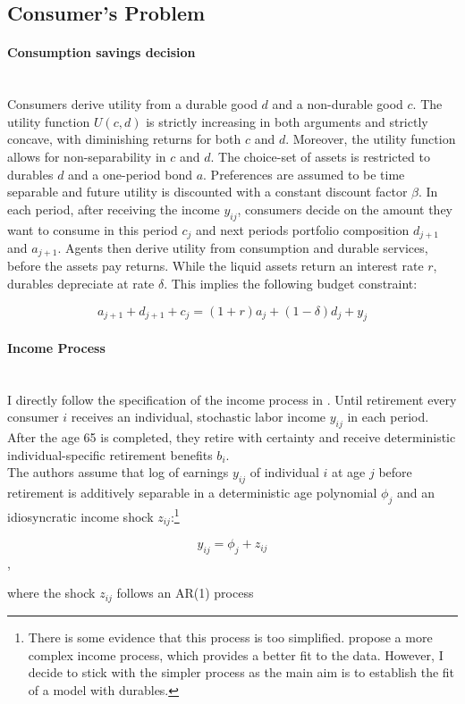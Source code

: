 \documentclass[a4paper,12pt,legno]{article}
\newcommand{\myparagraph}[1]{\paragraph{#1}\mbox{}\\}
\begin{document}
\subsection{Consumer's Problem} 
\myparagraph{Consumption savings decision}
Consumers derive utility from a durable good $d$ and a non-durable good $c$. The utility function $U(c,d)$ is strictly increasing in both arguments and strictly concave, with diminishing returns for both $c$ and $d$. Moreover, the utility function allows for non-separability in $c$ and $d$. The choice-set of assets is restricted to durables $d$ and a one-period bond $a$. Preferences are assumed to be time separable and future utility is discounted with a constant discount factor $\beta$.
In each period, after receiving the income $y_{ij}$, consumers decide on the amount they want to consume in this period $c_{j}$ and next periods portfolio composition $d_{j+1}$ and $a_{j+1}$. Agents then derive utility from consumption and durable services, before the assets pay returns. While the liquid assets return an interest rate $r$, durables depreciate at rate $\delta$. This implies the following budget constraint:  

\begin{equation}
a_{j+1}+d_{j+1}+c_{j}=(1+r)a_{j} + (1-\delta)d_{j}+y_{j}
\end{equation}

\myparagraph{Income Process}
I directly follow the specification of the income process in \cite{hintermaier2011}. Until retirement every consumer $i$ receives an individual, stochastic labor income $y_{ij}$ in each period. After the age 65 is completed, they retire with certainty and receive deterministic individual-specific retirement benefits $b_{i}$. \\
The authors assume that log of earnings $y_{ij}$ of individual $i$ at age $j$ before retirement is additively separable in a deterministic age polynomial $\phi_{j}$ and an idiosyncratic income shock $z_{ij}$:\footnote{There is some evidence that this process is too simplified. \cite{guvenen2015data} propose a more complex income process, which provides a better fit to the data. However, I decide to stick with the simpler process as the main aim is to establish the fit of a model with durables.} 

\begin{equation}\label{eq:income_process}
y_{ij}=\phi_{j}+z_{ij}
\end{equation},


where the shock $z_{ij}$ follows an AR(1) process
\end{document}
